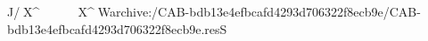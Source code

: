 J   /  X^                                                   X^ W   archive:/CAB-bdb13e4efbcafd4293d706322f8ecb9e/CAB-bdb13e4efbcafd4293d706322f8ecb9e.resS 